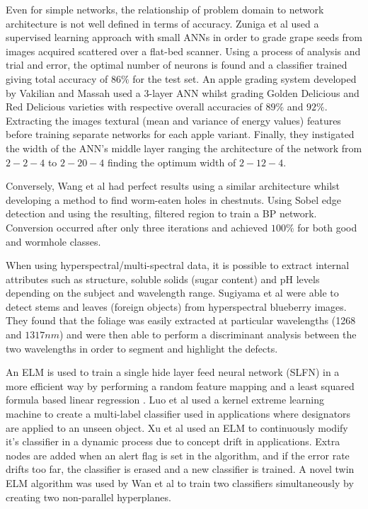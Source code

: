 \documentclass[fleqn,twoside,12pt]{report}
\begin{document}
Even for simple networks, the relationship of problem domain to network architecture is not well defined in terms of accuracy. Zuniga et al \cite{zuniga} used a supervised learning approach with small ANNs in order to grade grape seeds from images acquired scattered over a flat-bed scanner. Using a process of analysis and trial and error, the optimal number of neurons is found and a classifier trained giving total accuracy of $86\%$ for the test set. An apple grading system developed by Vakilian and Massah \cite{vakilian} used a 3-layer ANN whilst grading Golden Delicious and Red Delicious varieties with respective overall accuracies of $89\%$ and $92\%$. Extracting the images textural (mean and variance of energy values) features before training separate networks for each apple variant. Finally, they instigated the width of the ANN's middle layer ranging the architecture of the network from $2-2-4$ to $2-20-4$ finding the optimum width of $2-12-4$. 

Conversely, Wang et al \cite{wang} had perfect results using a similar architecture whilst developing a method to find worm-eaten holes in chestnuts. Using Sobel edge detection and using the resulting, filtered region to train a BP network. Conversion occurred after only three iterations and achieved $100\%$ for both good and wormhole classes.

When using hyperspectral/multi-spectral data, it is possible to extract internal attributes such as structure, soluble solids (sugar content) and pH levels depending on the subject and wavelength range. Sugiyama et al \cite{sugiyama} were able to detect stems and leaves (foreign objects) from hyperspectral blueberry images. They found that the foliage was easily extracted at particular wavelengths (1268 and $1317nm$) and were then able to perform a discriminant analysis between the two wavelengths in order to segment and highlight the defects.

An ELM is used to train a single hide layer feed neural network (SLFN) in a more efficient way by performing a random feature mapping and a least squared formula based linear regression \cite{peng}. Luo et al \cite{luo} used a kernel extreme learning machine to create a multi-label classifier used in applications where designators are applied to an unseen object. Xu et al \cite{xu} used an ELM to continuously modify it's classifier in a dynamic process due to concept drift in applications. Extra nodes are added when an alert flag is set in the algorithm, and if the error rate drifts too far, the classifier is erased and a new classifier is trained. A novel twin ELM algorithm was used by Wan et al \cite{wan} to train two classifiers simultaneously by creating two non-parallel hyperplanes. 
\end{document}
